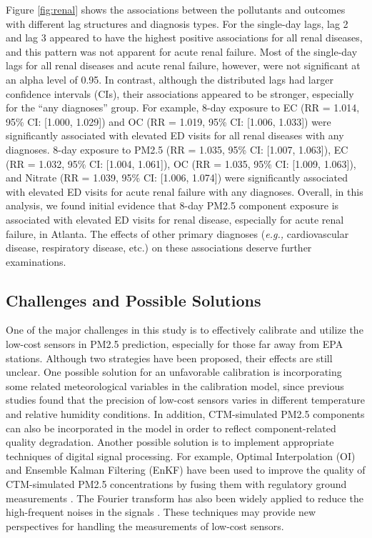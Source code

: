 \documentclass[11pt]{article}
\begin{document}
Figure \ref{fig:renal} shows the associations between the pollutants and outcomes with different lag structures and diagnosis types. For the single-day lags, lag 2 and lag 3 appeared to have the highest positive associations for all renal diseases, and this pattern was not apparent for acute renal failure. Most of the single-day lags for all renal diseases and acute renal failure, however, were not significant at an alpha level of 0.95. In contrast, although the distributed lags had larger confidence intervals (CIs), their associations appeared to be stronger, especially for the ``any diagnoses'' group. For example, 8-day exposure to EC (RR = 1.014, 95\% CI: [1.000, 1.029]) and OC (RR = 1.019, 95\% CI: [1.006, 1.033]) were significantly associated with elevated ED visits for all renal diseases with any diagnoses. 8-day exposure to PM2.5 (RR = 1.035, 95\% CI: [1.007, 1.063]), EC (RR = 1.032, 95\% CI: [1.004, 1.061]), OC (RR = 1.035, 95\% CI: [1.009, 1.063]), and Nitrate (RR = 1.039, 95\% CI: [1.006, 1.074]) were significantly associated with elevated ED visits for acute renal failure with any diagnoses. Overall, in this analysis, we found initial evidence that 8-day PM2.5 component exposure is associated with elevated ED visits for renal disease, especially for acute renal failure, in Atlanta. The effects of other primary diagnoses (\textit{e.g.,} cardiovascular disease, respiratory disease, etc.) on these associations deserve further examinations. 

\subsection{Challenges and Possible Solutions}
One of the major challenges in this study is to effectively calibrate and utilize the low-cost sensors in PM2.5 prediction, especially for those far away from EPA stations. Although two strategies have been proposed, their effects are still unclear. One possible solution for an unfavorable calibration is incorporating some related meteorological variables in the calibration model, since previous studies \citep{Holstius2014, Castell2017} found that the precision of low-cost sensors varies in different temperature and relative humidity conditions. In addition, CTM-simulated PM2.5 components can also be incorporated in the model in order to reflect component-related quality degradation. Another possible solution is to implement appropriate techniques of digital signal processing. For example, Optimal Interpolation (OI) and Ensemble Kalman Filtering (EnKF) have been used to improve the quality of CTM-simulated PM2.5 concentrations by fusing them with regulatory ground measurements \citep{Candiani2013}. The Fourier transform has also been widely applied to reduce the high-frequent noises in the signals \citep{Canales1984}. These techniques may provide new perspectives for handling the measurements of low-cost sensors. 
\end{document}
